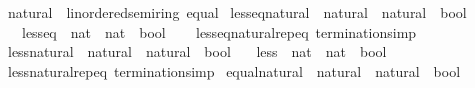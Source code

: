 \begin{isabellebody}
\isanewline
{}\isamarkupfalse%
\ natural\ {\isacharcolon}{\kern0pt}{\isacharcolon}{\kern0pt}\ {\isachardoublequoteopen}{\isacharbraceleft}{\kern0pt}linordered{\isacharunderscore}{\kern0pt}semiring{\isacharcomma}{\kern0pt}\ equal{\isacharbraceright}{\kern0pt}{\isachardoublequoteclose}\isanewline
{}\isanewline
\isanewline
{}\isamarkupfalse%
\ less{\isacharunderscore}{\kern0pt}eq{\isacharunderscore}{\kern0pt}natural\ {\isacharcolon}{\kern0pt}{\isacharcolon}{\kern0pt}\ {\isachardoublequoteopen}natural\ {\isasymRightarrow}\ natural\ {\isasymRightarrow}\ bool{\isachardoublequoteclose}\isanewline
\ \ \ {\isachardoublequoteopen}less{\isacharunderscore}{\kern0pt}eq\ {\isacharcolon}{\kern0pt}{\isacharcolon}{\kern0pt}\ nat\ {\isasymRightarrow}\ nat\ {\isasymRightarrow}\ bool{\isachardoublequoteclose}\isanewline
%
\isadelimproof
\ \ %
\endisadelimproof
%
\isatagproof
\isacommand{{\isachardot}{\kern0pt}}\isamarkupfalse%
%
\endisatagproof
{\isafoldproof}%
%
\isadelimproof
\isanewline
%
\endisadelimproof
\isanewline
{}\isamarkupfalse%
\ less{\isacharunderscore}{\kern0pt}eq{\isacharunderscore}{\kern0pt}natural{\isachardot}{\kern0pt}rep{\isacharunderscore}{\kern0pt}eq\ {\isacharbrackleft}{\kern0pt}termination{\isacharunderscore}{\kern0pt}simp{\isacharbrackright}{\kern0pt}\isanewline
\isanewline
{}\isamarkupfalse%
\ less{\isacharunderscore}{\kern0pt}natural\ {\isacharcolon}{\kern0pt}{\isacharcolon}{\kern0pt}\ {\isachardoublequoteopen}natural\ {\isasymRightarrow}\ natural\ {\isasymRightarrow}\ bool{\isachardoublequoteclose}\isanewline
\ \ \ {\isachardoublequoteopen}less\ {\isacharcolon}{\kern0pt}{\isacharcolon}{\kern0pt}\ nat\ {\isasymRightarrow}\ nat\ {\isasymRightarrow}\ bool{\isachardoublequoteclose}\isanewline
%
\isadelimproof
\ \ %
\endisadelimproof
%
\isatagproof
\isacommand{{\isachardot}{\kern0pt}}\isamarkupfalse%
%
\endisatagproof
{\isafoldproof}%
%
\isadelimproof
\isanewline
%
\endisadelimproof
\isanewline
{}\isamarkupfalse%
\ less{\isacharunderscore}{\kern0pt}natural{\isachardot}{\kern0pt}rep{\isacharunderscore}{\kern0pt}eq\ {\isacharbrackleft}{\kern0pt}termination{\isacharunderscore}{\kern0pt}simp{\isacharbrackright}{\kern0pt}\isanewline
\isanewline
{}\isamarkupfalse%
\ equal{\isacharunderscore}{\kern0pt}natural\ {\isacharcolon}{\kern0pt}{\isacharcolon}{\kern0pt}\ {\isachardoublequoteopen}natural\ {\isasymRightarrow}\ natural\ {\isasymRightarrow}\ bool{\isachardoublequoteclose}\isanewline

\end{isabellebody}
